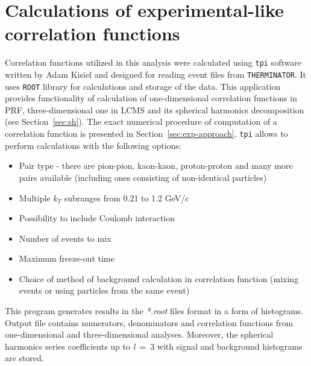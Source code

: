   \section{Calculations of experimental-like correlation functions}
    Correlation functions utilized in this analysis were calculated using \verb|tpi| software written by Adam Kisiel and designed for reading event files from \verb|THERMINATOR|.
    It uses \verb|ROOT| library for calculations and storage of the data.
    This application provides functionality of calculation of one-dimensional correlation functions in PRF, three-dimensional one in LCMS and its spherical harmonics decomposition (see Section~\ref{sec:sh}).
    The exact numerical procedure of computation of a correlation function is presented in Section~\ref{sec:exp-approach}.
    \verb|tpi| allows to perform calculations with the following options:
    \begin{itemize}
      \item Pair type - there are pion-pion, kaon-kaon, proton-proton and many more pairs available (including ones consisting of non-identical particles)
      \item Multiple $k_T$ subranges from 0.21 to 1.2 GeV/c
      \item Possibility to include Coulomb interaction
      \item Number of events to mix
      \item Maximum freeze-out time
      \item Choice of method of background calculation in correlation function (mixing events or using particles from the same event)
    \end{itemize}
    This program generates results in the \textit{*.root} files format in a form of histograms.
    Output file contains numerators, denominators and correlation functions from one-dimensional and three-dimensional analyses.
    Moreover, the spherical harmonics series coefficients up to \textit{l}~=~3 with signal and background histograms are stored.
